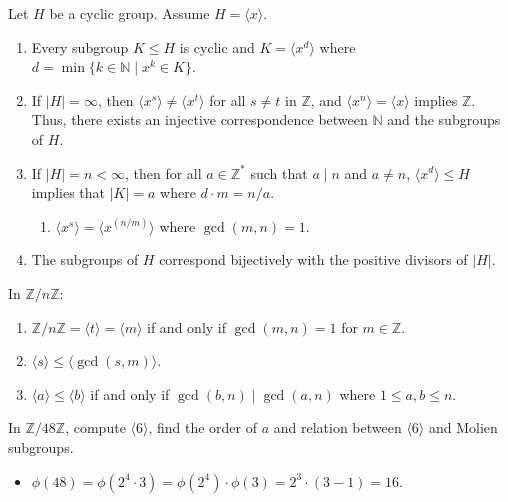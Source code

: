 \documentclass[11pt,a4paper]{article}
\begin{document}
\begin{teo}
    Let \( H \) be a cyclic group. Assume \( H = \langle x \rangle \).

\begin{enumerate}
    \item Every subgroup \( K \leq H \) is cyclic and \( K = \langle x^d \rangle \) where \( d = \min \{k \in \mathbb{N} \mid x^k \in K \} \).
    
    \item If \( |H| = \infty \), then \( \langle x^s \rangle \neq \langle x^t \rangle \) for all \( s \neq t \) in \( \mathbb{Z} \), and \( \langle x^n \rangle = \langle x \rangle \) implies \( \mathbb{Z} \). Thus, there exists an injective correspondence between \( \mathbb{N} \) and the subgroups of \( H \).
    
    \item If \( |H| = n < \infty \), then for all \( a \in \mathbb{Z}^* \) such that \( a \mid n \) and \( a \neq n \), \( \langle x^d \rangle \leq H \) implies that \( |K| = a \) where \( d \cdot m = n/a \).
    \begin{enumerate}
        \item \( \langle x^s \rangle = \langle x^{(n/m)} \rangle \) where \( \gcd(m, n) = 1 \).
    \end{enumerate}
    
    \item The subgroups of \( H \) correspond bijectively with the positive divisors of \( |H| \).
\end{enumerate}
\end{teo}

\begin{rem}
    In \( \mathbb{Z}/n\mathbb{Z} \):
    \begin{enumerate}
        \item \( \mathbb{Z}/n\mathbb{Z} = \langle t \rangle = \langle m \rangle \) if and only if \( \gcd(m, n) = 1 \) for \( m \in \mathbb{Z} \).
        \item \( \langle s \rangle \leq \langle \gcd(s, m) \rangle \).
        \item \( \langle a \rangle \leq \langle b \rangle \) if and only if \( \gcd(b, n) \mid \gcd(a, n) \) where \( 1 \leq a, b \leq n \).
    \end{enumerate}
\end{rem}

\begin{exa}
    In \( \mathbb{Z}/48\mathbb{Z} \), compute \( \langle 6 \rangle \), find the order of \( a \) and relation between \( \langle 6 \rangle \) and Molien subgroups.
\begin{itemize}
    \item \( \phi(48) = \phi(2^4 \cdot 3) = \phi(2^4) \cdot \phi(3) = 2^3 \cdot (3-1) = 16 \).
\end{itemize}
\end{exa}
\end{document}
